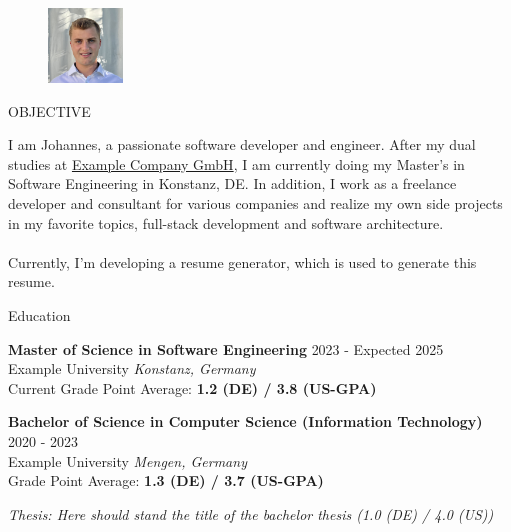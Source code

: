 \documentclass{resume}
\begin{document}
    
        \begin{figure}[H]
        \centering
        \includegraphics[width=75px]{../web/public/johannes-brandenburger.png}
        \end{figure}
        \vspace{-2em}
        

    \begin{rSection}{OBJECTIVE}

    {I am Johannes, a passionate software developer and engineer. After my dual studies at \href{https://www.example.com/}{Example Company GmbH}, I am currently doing my Master's in Software Engineering in Konstanz, DE. In addition, I work as a freelance developer and consultant for various companies and realize my own side projects in my favorite topics, full-stack development and software architecture. \\\\Currently, I'm developing a resume generator, which is used to generate this resume.}

    \end{rSection}
    
    \begin{rSection}{Education}
    
        {\bf Master of Science in Software Engineering} \hfill {2023 - Expected 2025}\\
        Example University \hfill \textit{Konstanz, Germany}\\
        Current Grade Point Average: \textbf{1.2 (DE) / 3.8 (US-GPA)}

        {\bf Bachelor of Science in Computer Science (Information Technology)} \hfill {2020 - 2023}\\
        Example University \hfill \textit{Mengen, Germany}\\
        Grade Point Average: \textbf{1.3 (DE) / 3.7 (US-GPA)}\\\begin{small}\textit{Thesis: Here should stand the title of the bachelor thesis (1.0 (DE) / 4.0 (US))}\end{small}

    \end{rSection}
    
\end{document}
